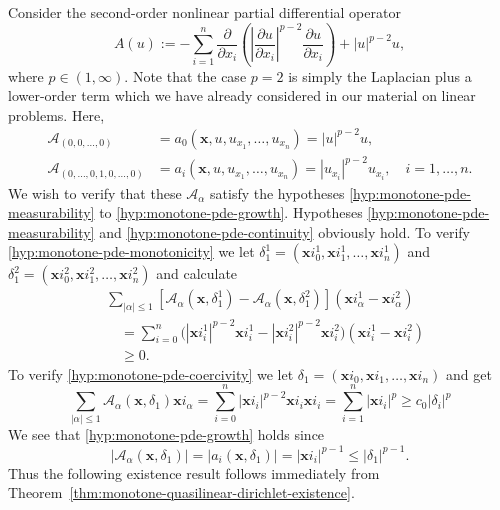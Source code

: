 \begin{Example}
\label{ex:anisotropic-p-power-nonlinear-elliptic-operator}
Consider the second-order nonlinear partial differential operator
\begin{equation}\label{eq:anisotropic-p-power-divergence-example}
A(u):=-\sum_{i=1}^n\dfrac{\partial}{\partial x_i}\left(\left|\dfrac{\partial u}{\partial x_i}\right|^{p-2}\dfrac{\partial u}{\partial x_i}\right)+|u|^{p-2}u,
\end{equation}
where $p\in(1,\infty)$. Note that the case $p=2$ is simply the Laplacian plus a lower-order term which we have already considered in our material on linear problems. Here,\[\begin{aligned}
\mathcal{A}_{(0,0,\ldots,0)}&=a_0(\bm{x},u,u_{x_1},\ldots,u_{x_n})=|u|^{p-2}u,\\
\mathcal{A}_{(0,\ldots,0,1,0,\ldots,0)}&=a_i(\bm{x},u,u_{x_1},\ldots,u_{x_n})=|u_{x_i}|^{p-2}u_{x_i},\quad i=1,\ldots,n.
\end{aligned}\]We wish to verify that these $\mathcal{A}_\alpha$ satisfy the hypotheses \ref{hyp:monotone-pde-measurability} to \ref{hyp:monotone-pde-growth}. Hypotheses \ref{hyp:monotone-pde-measurability} and \ref{hyp:monotone-pde-continuity} obviously hold. To verify \ref{hyp:monotone-pde-monotonicity} we let $\delta_1^1=(\bm{x}i_0^1,\bm{x}i_1^1,\ldots,\bm{x}i_n^1)$ and $\delta_1^2=(\bm{x}i_0^2,\bm{x}i_1^2,\ldots,\bm{x}i_n^2)$ and calculate\[\begin{aligned}
&\sum_{|\alpha|\leq1}[\mathcal{A}_\alpha(\bm{x},\delta_1^1)-\mathcal{A}_\alpha(\bm{x},\delta_1^2)](\bm{x}i_\alpha^1-\bm{x}i_\alpha^2)\\
&\quad=\sum_{i=0}^n\bigl(|\bm{x}i_i^1|^{p-2}\bm{x}i_i^1-|\bm{x}i_i^2|^{p-2}\bm{x}i_i^2\bigr)(\bm{x}i_i^1-\bm{x}i_i^2)\\
&\quad\geq0.
\end{aligned}\]To verify \ref{hyp:monotone-pde-coercivity} we let $\delta_1=(\bm{x}i_0,\bm{x}i_1,\ldots,\bm{x}i_n)$ and get
\begin{equation}\label{eq:anisotropic-p-power-printed-coercivity-chain}
\sum_{|\alpha|\leq1}\mathcal{A}_\alpha(\bm{x},\delta_1)\bm{x}i_\alpha=\sum_{i=0}^n|\bm{x}i_i|^{p-2}\bm{x}i_i\bm{x}i_i=\sum_{i=1}^n|\bm{x}i_i|^p\geq c_0|\delta_i|^p
\end{equation}
We see that \ref{hyp:monotone-pde-growth} holds since
\begin{equation}\label{eq:anisotropic-p-power-coefficient-growth}
|\mathcal{A}_\alpha(\bm{x},\delta_1)|=|a_i(\bm{x},\delta_1)|=|\bm{x}i_i|^{p-1}\leq|\delta_1|^{p-1}.
\end{equation}
Thus the following existence result follows immediately from Theorem~\ref{thm:monotone-quasilinear-dirichlet-existence}.
\end{Example}

